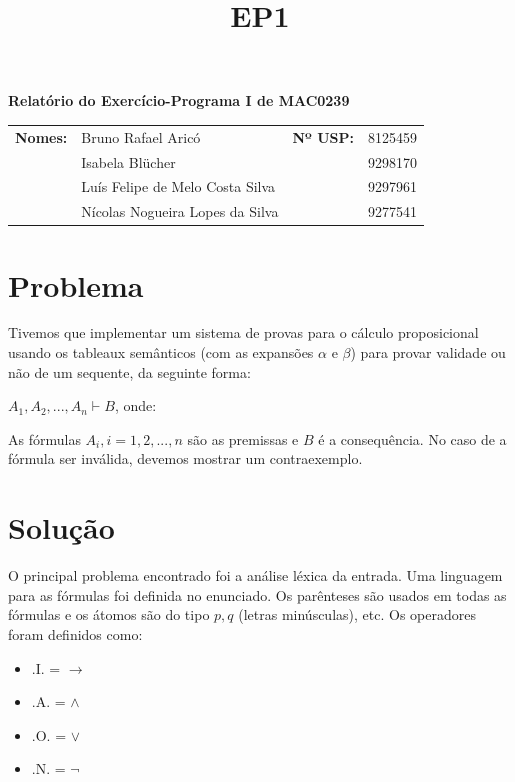 \documentclass[12pt,letterpaper]{article}
\title{EP1}
\begin{document}
	
\begin{center}
	\large \bf
	Relatório do Exercício-Programa I de MAC0239 \\
\end{center}
	
\begin{table}[]
	\centering
	\label{my-label}
	\begin{tabular}{llll}
		\textbf{Nomes:} & Bruno Rafael Aricó        &\textbf{Nº USP:} & 8125459 \\
		& Isabela Blücher                 &         & 9298170 \\
		& Luís Felipe de Melo Costa Silva &         & 9297961 \\
		& Nícolas Nogueira Lopes da Silva &         & 9277541 \\
	\end{tabular}
\end{table}

\section{Problema}

Tivemos que implementar um sistema de provas para o cálculo proposicional usando os tableaux semânticos (com as expansões $\alpha$ e $\beta$) para provar validade ou não de um sequente, da seguinte forma: 
\begin{center}
	$A_1, A_2, ..., A_n \vdash B$, onde:
\end{center}
As fórmulas $A_i, i = 1, 2, ..., n$ são as premissas e $B$ é a consequência. No caso de a fórmula ser inválida, devemos mostrar um contraexemplo.

\section{Solução}

O principal problema encontrado foi a análise léxica da entrada. Uma linguagem para as fórmulas foi definida no enunciado. Os parênteses são usados em todas as fórmulas e os átomos são do tipo $p, q$ (letras minúsculas), etc. Os operadores foram definidos como:
	
\begin{itemize}
	\item .I. = $\to$ 
	\item .A. = $\land$
	\item .O. = $\lor$
	\item .N. = $\lnot$
\end{itemize}
\end{document}
